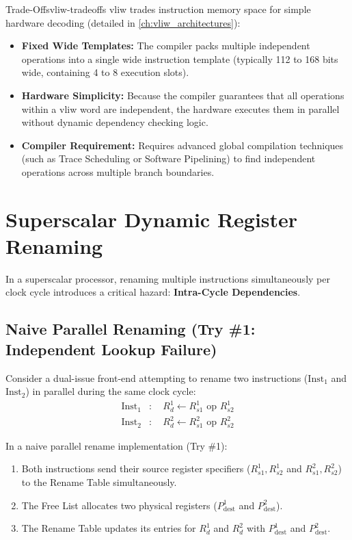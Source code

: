 \begin{concept}{ Trade-Offs}{vliw-tradeoffs}
\gls{vliw} trades instruction memory space for simple hardware decoding (detailed in \cref{ch:vliw_architectures}):
\begin{itemize}
    \item \textbf{Fixed Wide Templates:} The compiler packs multiple independent operations into a single wide instruction template (typically 112 to 168 bits wide, containing 4 to 8 execution slots).
    \item \textbf{Hardware Simplicity:} Because the compiler guarantees that all operations within a \gls{vliw} word are independent, the hardware executes them in parallel without dynamic dependency checking logic.
    \item \textbf{Compiler Requirement:} Requires advanced global compilation techniques (such as Trace Scheduling or Software Pipelining) to find independent operations across multiple branch boundaries.
\end{itemize}
\end{concept}

\section{Superscalar Dynamic Register Renaming}
\label{sec:superscalar_register_renaming}

In a superscalar processor, renaming multiple instructions simultaneously per clock cycle introduces a critical hazard: \textbf{Intra-Cycle  Dependencies}.

\subsection{Naive Parallel Renaming (Try \#1: Independent Lookup Failure)}

Consider a dual-issue front-end attempting to rename two instructions ($\text{Inst}_1$ and $\text{Inst}_2$) in parallel during the same clock cycle:
\begin{align*}
\text{Inst}_1&: \quad R_d^1 \leftarrow R_{s1}^1 \text{ op } R_{s2}^1 \\
\text{Inst}_2&: \quad R_d^2 \leftarrow R_{s1}^2 \text{ op } R_{s2}^2
\end{align*}

In a naive parallel rename implementation (Try \#1):
\begin{enumerate}
    \item Both instructions send their source register specifiers ($R_{s1}^1, R_{s2}^1$ and $R_{s1}^2, R_{s2}^2$) to the Rename Table simultaneously.
    \item The Free List allocates two physical registers ($P_{\text{dest}}^1$ and $P_{\text{dest}}^2$).
    \item The Rename Table updates its entries for $R_d^1$ and $R_d^2$ with $P_{\text{dest}}^1$ and $P_{\text{dest}}^2$.
\end{enumerate}

